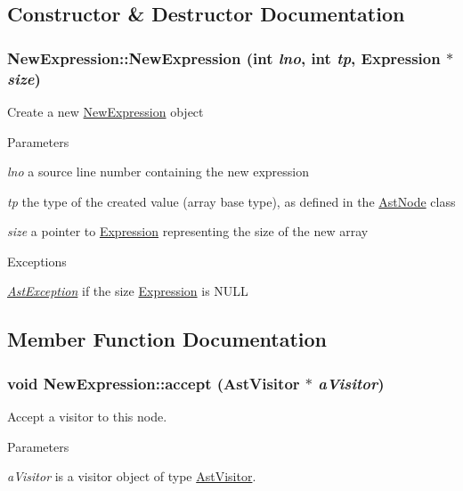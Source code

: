 \subsection{Constructor \& Destructor Documentation}
\hypertarget{classNewExpression_a19c967d630d86b4ff25b95e589d3a84d}{
\subsubsection[{NewExpression}]{\setlength{\rightskip}{0pt plus 5cm}NewExpression::NewExpression (int {\em lno}, \/  int {\em tp}, \/  {\bf Expression} $\ast$ {\em size})}}
\label{classNewExpression_a19c967d630d86b4ff25b95e589d3a84d}
Create a new \hyperlink{classNewExpression}{NewExpression} object


\begin{DoxyParams}{Parameters}
\item[{\em lno}]a source line number containing the new expression \item[{\em tp}]the type of the created value (array base type), as defined in the \hyperlink{classAstNode}{AstNode} class \item[{\em size}]a pointer to \hyperlink{classExpression}{Expression} representing the size of the new array \end{DoxyParams}

\begin{DoxyExceptions}{Exceptions}
\item[{\em \hyperlink{classAstException}{AstException}}]if the size \hyperlink{classExpression}{Expression} is NULL \end{DoxyExceptions}


\subsection{Member Function Documentation}
\hypertarget{classNewExpression_a4b5178e78150432ac58a08197204fa27}{
\subsubsection[{accept}]{\setlength{\rightskip}{0pt plus 5cm}void NewExpression::accept ({\bf AstVisitor} $\ast$ {\em aVisitor})}}
\label{classNewExpression_a4b5178e78150432ac58a08197204fa27}
Accept a visitor to this node. 
\begin{DoxyParams}{Parameters}
\item[{\em aVisitor}]is a visitor object of type \hyperlink{classAstVisitor}{AstVisitor}. \end{DoxyParams}



